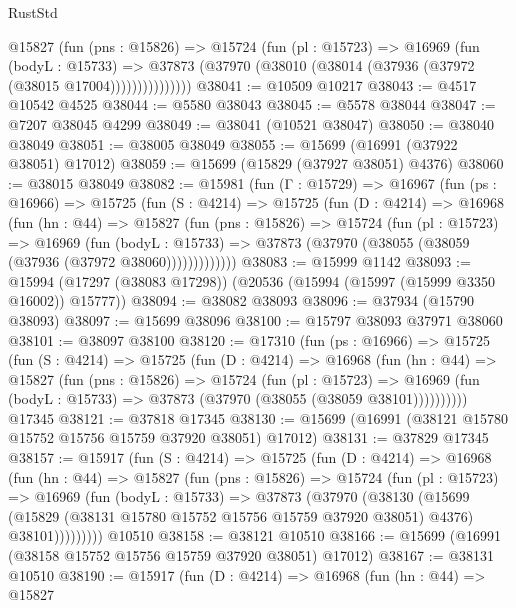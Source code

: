 \begin{lexlean}{RustStd}
\begin{coremodule}
              @15827
                (fun (pns : @15826) =>
                @15724
                  (fun (pl : @15723) =>
                  @16969
                    (fun (bodyL : @15733) =>
                    @37873 (@37970 (@38010 (@38014 (@37936 (@37972 (@38015 @17004)))))))))))))))
@38041 := @10509 @10217
@38043 := @4517 @10542 @4525
@38044 := @5580 @38043
@38045 := @5578 @38044
@38047 := @7207 @38045 @4299
@38049 := @38041 (@10521 @38047)
@38050 := @38040 @38049
@38051 := @38005 @38049
@38055 := @15699 (@16991 (@37922 @38051) @17012)
@38059 := @15699 (@15829 (@37927 @38051) @4376)
@38060 := @38015 @38049
@38082 := @15981
    (fun (Γ : @15729) =>
    @16967
      (fun (ps : @16966) =>
      @15725
        (fun (S : @4214) =>
        @15725
          (fun (D : @4214) =>
          @16968
            (fun (hn : @44) =>
            @15827
              (fun (pns : @15826) =>
              @15724
                (fun (pl : @15723) =>
                @16969
                  (fun (bodyL : @15733) =>
                  @37873 (@37970 (@38055 (@38059 (@37936 (@37972 @38060)))))))))))))
@38083 := @15999 @1142
@38093 := @15994 (@17297 (@38083 @17298)) (@20536 (@15994 (@15997 (@15999 @3350 @16002)) @15777))
@38094 := @38082 @38093
@38096 := @37934 (@15790 @38093)
@38097 := @15699 @38096
@38100 := @15797 @38093 @37971 @38060
@38101 := @38097 @38100
@38120 := @17310
    (fun (ps : @16966) =>
    @15725
      (fun (S : @4214) =>
      @15725
        (fun (D : @4214) =>
        @16968
          (fun (hn : @44) =>
          @15827
            (fun (pns : @15826) =>
            @15724
              (fun (pl : @15723) =>
              @16969 (fun (bodyL : @15733) => @37873 (@37970 (@38055 (@38059 @38101))))))))))
    @17345
@38121 := @37818 @17345
@38130 := @15699 (@16991 (@38121 @15780 @15752 @15756 @15759 @37920 @38051) @17012)
@38131 := @37829 @17345
@38157 := @15917
    (fun (S : @4214) =>
    @15725
      (fun (D : @4214) =>
      @16968
        (fun (hn : @44) =>
        @15827
          (fun (pns : @15826) =>
          @15724
            (fun (pl : @15723) =>
            @16969
              (fun (bodyL : @15733) =>
              @37873
                (@37970
                  (@38130
                    (@15699
                      (@15829 (@38131 @15780 @15752 @15756 @15759 @37920 @38051) @4376)
                      @38101)))))))))
    @10510
@38158 := @38121 @10510
@38166 := @15699 (@16991 (@38158 @15752 @15756 @15759 @37920 @38051) @17012)
@38167 := @38131 @10510
@38190 := @15917
    (fun (D : @4214) =>
    @16968
      (fun (hn : @44) =>
      @15827

\end{coremodule}
\end{lexlean}
